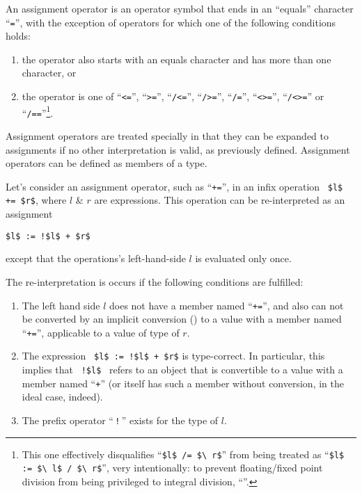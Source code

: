 An assignment operator is an operator symbol that ends in an ``equals'' character ``\lstinline!=!'', with the exception of operators for which one of the following conditions holds: 
\begin{enumerate}
  \item the operator also starts with an equals character and has more than one character, or
  \item the operator is one of ``\lstinline!<=!'', ``\lstinline!>=!'', ``\lstinline!/<=!'', ``\lstinline!/>=!'', ``\lstinline!/=!'', ``\lstinline!<>=!'', ``\lstinline!/<>=!'' or ``\lstinline!/==!''\footnote{This one effectively disqualifies ``\lstinline!$l$ /= $\ r$!'' from being treated as ``\lstinline!$l$ := $\ l$ / $\ r$!'', very intentionally: to prevent floating/fixed point division from being privileged to integral division, ``''.}.
\end{enumerate}

Assignment operators are treated specially in that they can be expanded to assignments if no other interpretation is valid, as previously defined. Assignment operators can be defined as members of a type. 

Let's consider an assignment operator, such as ``\lstinline!+=!'', in an infix operation ~\lstinline!$l$ += $r$!, where $l$ \& $r$ are expressions. This operation can be re-interpreted as an assignment
\begin{lstlisting}
$l$ := !$l$ + $r$
\end{lstlisting}
except that the operations's left-hand-side $l$ is evaluated only once. 

The re-interpretation is occurs if the following conditions are fulfilled:
\begin{enumerate}
  \item The left hand side $l$ does not have a member named ``\lstinline!+=!'', and also can not be converted by an implicit conversion () to a value with a member named ``\lstinline!+=!'', applicable to a value of type of $r$. 
  \item The expression ~\lstinline|$l$ := !$l$ + $r$| is type-correct. In particular, this implies that ~\lstinline|!$l$|~ refers to an object that is convertible to a value with a member named ``\lstinline!+!'' (or itself has such a member without conversion, in the ideal case, indeed). 
  \item The prefix operator ``\,\lstinline|!|\,'' exists for the type of $l$. 
\end{enumerate}


